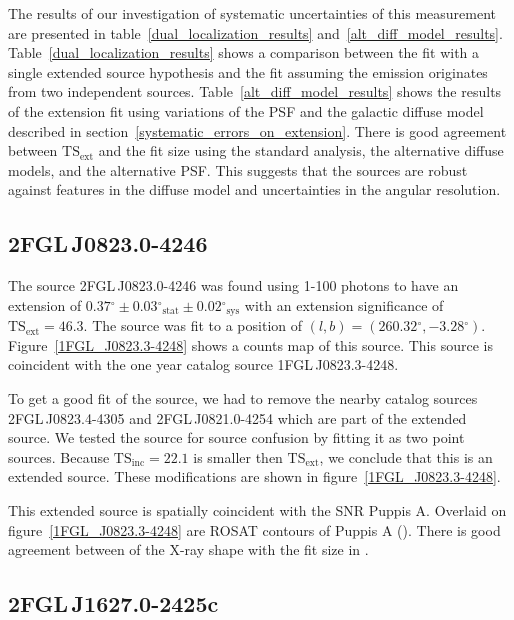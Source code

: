\documentclass[12pt,preprint]{aastex}
\newcommand{\gev}{\text{GeV}\xspace}
\newcommand{\tsext}{{\ensuremath{\text{TS}_{\text{ext}}}}\xspace}
\newcommand{\tsinc}{\ensuremath{\text{TS}_{\text{inc}}}\xspace}
\newcommand{\sys}{\text{sys}\xspace}
\newcommand{\stat}{\text{stat}\xspace}
\renewcommand{\deg}{\ensuremath{^\circ}\xspace}
\begin{document}
The results of our investigation of systematic uncertainties of this
measurement are presented in table~\ref{dual_localization_results}
and~\ref{alt_diff_model_results}.  Table~\ref{dual_localization_results}
shows a comparison between the fit with a single extended source
hypothesis and the fit assuming the emission originates from two
independent sources.  Table~\ref{alt_diff_model_results} shows the
results of the extension fit using variations of the PSF and the galactic
diffuse model described in section~\ref{systematic_errors_on_extension}.
There is good agreement between \tsext and the fit size using
the standard analysis, the alternative diffuse models, and the alternative PSF.
This suggests that the sources are robust against features in the diffuse
model and uncertainties in the angular resolution.

\subsection{2FGL\,J0823.0-4246}
\label{section_2FGL_J0823.0-4246}


The source 2FGL\,J0823.0-4246 was found 
using 1-100 \gev photons to have an 
extension of $0.37\deg\pm0.03\deg_\stat\pm0.02\deg_\sys$ 
with an extension
significance of $\tsext=46.3$.  The source was fit to a position of
$(l,b)=(260.32\deg,-3.28\deg)$.  Figure~\ref{1FGL_J0823.3-4248} shows a
counts map of this source.  This source is coincident with the one year
catalog source 1FGL\,J0823.3-4248.

To get a good fit of the source, we had to remove the nearby catalog
sources 2FGL\,J0823.4-4305 and 2FGL\,J0821.0-4254 which are part of the
extended source.  We tested the source for source confusion by fitting
it as two point sources. Because $\tsinc=22.1$ is smaller then \tsext,
we conclude that this is an extended source.  These modifications are
shown in figure~\ref{1FGL_J0823.3-4248}.

This extended source is spatially coincident with the SNR Puppis A.
Overlaid on figure~\ref{1FGL_J0823.3-4248} are ROSAT contours of Puppis
A (\cite{rosat_puppis_a}). There is good agreement between of the X-ray
shape with the fit size in \gev.


\subsection{2FGL\,J1627.0-2425c}
\label{section_2FGL_J1627.0-2425c}
\end{document}

